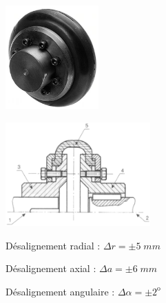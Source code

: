 \documentclass[11pt,oneside]{article}
\begin{document}
\noindent\begin{minipage}[c]{.25\linewidth}
\begin{center}
\includegraphics[height=4cm]{png/fig_13}
\end{center}
\end{minipage} \hfill
\begin{minipage}[c]{.4\linewidth}
\begin{center}
\includegraphics[height=4cm]{png/fig_14}
\end{center}
\end{minipage}\hfill
\begin{minipage}[c]{.3\linewidth}
Désalignement radial : 
$\Delta r = \pm 5\; mm$

Désalignement axial : 
$\Delta a = \pm 6\; mm$

Désalignement angulaire : 
$\Delta \alpha = \pm 2^\text{o}$
\end{minipage}
\end{document}
